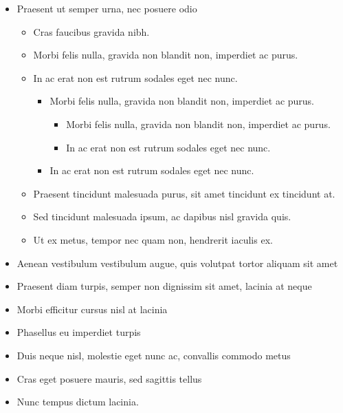 \documentclass[12pt,a4paper]{report}
\begin{document}
\begin{itemize}
    \item Praesent ut semper urna, nec posuere odio
        \begin{itemize}
            \item  Cras faucibus gravida nibh.
            \item  Morbi felis nulla, gravida non blandit non, imperdiet ac purus.
            \item  In ac erat non est rutrum sodales eget nec nunc.
                \begin{itemize}
                    \item  Morbi felis nulla, gravida non blandit non, imperdiet ac purus.
                    \begin{itemize}
                        \item  Morbi felis nulla, gravida non blandit non, imperdiet ac purus.
                        \item  In ac erat non est rutrum sodales eget nec nunc.
                    \end{itemize}
                    \item  In ac erat non est rutrum sodales eget nec nunc.
                \end{itemize}
            \item  Praesent tincidunt malesuada purus, sit amet tincidunt ex tincidunt at.
            \item  Sed tincidunt malesuada ipsum, ac dapibus nisl gravida quis.
            \item  Ut ex metus, tempor nec quam non, hendrerit iaculis ex.
        \end{itemize}
    \item Aenean vestibulum vestibulum augue, quis volutpat tortor aliquam sit amet
    \item Praesent diam turpis, semper non dignissim sit amet, lacinia at neque
    \item Morbi efficitur cursus nisl at lacinia
    \item Phasellus eu imperdiet turpis
    \item Duis neque nisl, molestie eget nunc ac, convallis commodo metus
    \item Cras eget posuere mauris, sed sagittis tellus
    \item Nunc tempus dictum lacinia. 
\end{itemize}
\end{document}
